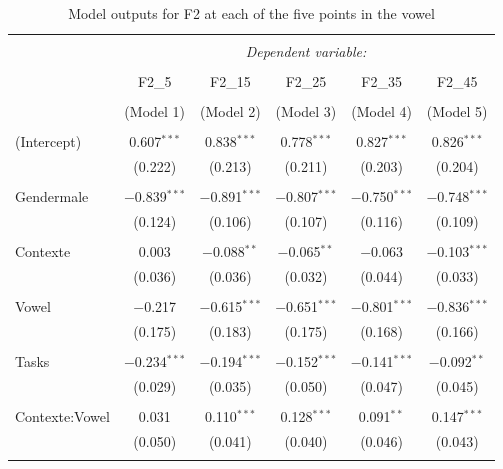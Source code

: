 \documentclass[charis,linguex]{glossa}
\newcommand{\nt}[1]{\textipa{[#1]}} %
\begin{document}
\begin{table}[htbp] \centering 
	\caption{Model outputs for F2 at each of the five points in the vowel} 
	\label{table_F2_fixed_effects} 
	\begin{tabular}{@{\extracolsep{5pt}}lccccc} 
		\\[-1.8ex]\hline 
		\hline \\[-1.8ex] 
		& \multicolumn{5}{c}{\textit{Dependent variable:}} \\ 
		\cline{2-6} 
		\\[-1.8ex] & F2\_5 & F2\_15 & F2\_25 & F2\_35 & F2\_45 \\ 
		\\[-1.8ex] & (Model 1) & (Model 2) & (Model 3) & (Model 4) & (Model 5)\\ 
		\hline \\[-1.8ex] 
		(Intercept) & 0.607$^{***}$ & 0.838$^{***}$ & 0.778$^{***}$ & 0.827$^{***}$ & 0.826$^{***}$ \\ 
		& (0.222) & (0.213) & (0.211) & (0.203) & (0.204) \\ 
		& & & & & \\ 
		Gendermale & $-$0.839$^{***}$ & $-$0.891$^{***}$ & $-$0.807$^{***}$ & $-$0.750$^{***}$ & $-$0.748$^{***}$ \\ 
		& (0.124) & (0.106) & (0.107) & (0.116) & (0.109) \\ 
		& & & & & \\ 
		Contexte & 0.003 & $-$0.088$^{**}$ & $-$0.065$^{**}$ & $-$0.063 & $-$0.103$^{***}$ \\ 
		& (0.036) & (0.036) & (0.032) & (0.044) & (0.033) \\ 
		& & & & & \\ 
		Vowel\nt{2} & $-$0.217 & $-$0.615$^{***}$ & $-$0.651$^{***}$ & $-$0.801$^{***}$ & $-$0.836$^{***}$ \\ 
		& (0.175) & (0.183) & (0.175) & (0.168) & (0.166) \\ 
		& & & & & \\
		Tasks & $-$0.234$^{***}$ & $-$0.194$^{***}$ & $-$0.152$^{***}$ & $-$0.141$^{***}$ & $-$0.092$^{**}$ \\ 
		& (0.029) & (0.035) & (0.050) & (0.047) & (0.045) \\ 
		& & & & & \\
		Contexte:Vowel\nt{2} & 0.031 & 0.110$^{***}$ & 0.128$^{***}$ & 0.091$^{**}$ & 0.147$^{***}$ \\ 
		& (0.050) & (0.041) & (0.040) & (0.046) & (0.043) \\ 
		& & & & & \\   

\end{tabular}
\end{table}
\end{document}
